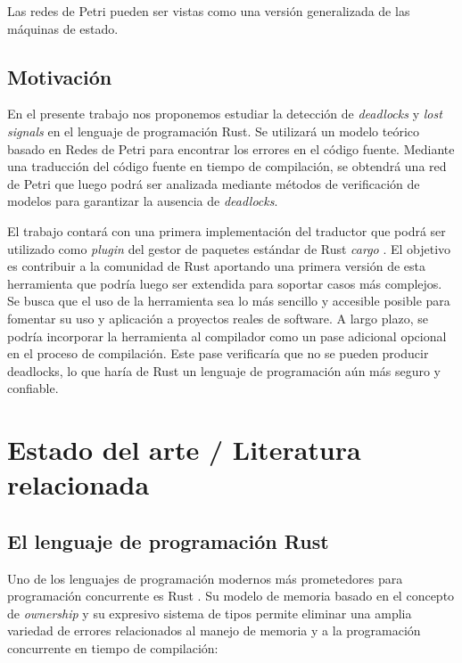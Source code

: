 \documentclass[12pt]{article}
\begin{document}
Las redes de Petri pueden ser vistas como una versión generalizada de las máquinas de estado.

\subsection{Motivación}

En el presente trabajo nos proponemos estudiar la detección de \textit{deadlocks} y \textit{lost signals} en el lenguaje de programación Rust.
Se utilizará un modelo teórico basado en Redes de Petri para encontrar los errores en el código fuente. Mediante una traducción del código fuente
en tiempo de compilación, se obtendrá una red de Petri que luego podrá ser analizada mediante métodos de verificación de modelos para garantizar la ausencia de \textit{deadlocks}.

El trabajo contará con una primera implementación del traductor que podrá ser utilizado como \textit{plugin} del gestor de paquetes estándar de Rust \textit{cargo} \cite{cargo-website}.
El objetivo es contribuir a la comunidad de Rust aportando una primera versión de esta herramienta que podría luego ser extendida para soportar casos más complejos.
Se busca que el uso de la herramienta sea lo más sencillo y accesible posible para fomentar su uso y aplicación a proyectos reales de software.
A largo plazo, se podría incorporar la herramienta al compilador como un pase adicional opcional en el proceso de compilación.
Este pase verificaría que no se pueden producir deadlocks, lo que haría de Rust un lenguaje de programación aún más seguro y confiable.

\bigskip

\section{Estado del arte / Literatura relacionada}

\subsection{El lenguaje de programación Rust}

Uno de los lenguajes de programación modernos más prometedores para programación concurrente es Rust \cite{rust-website}.
Su modelo de memoria basado en el concepto de \textit{ownership} y su expresivo sistema de tipos permite eliminar una amplia variedad de
errores relacionados al manejo de memoria y a la programación concurrente en tiempo de compilación:
\end{document}
